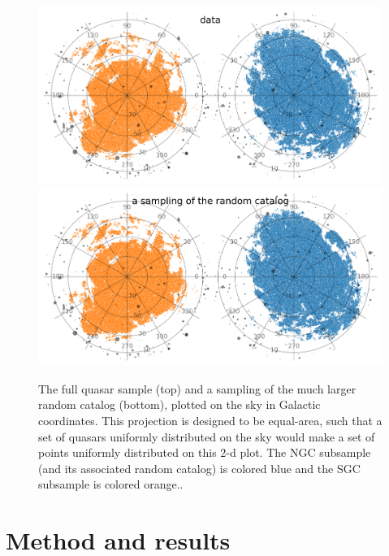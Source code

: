 \documentclass[modern]{aastex631}
\newlength{\figurewidth}
\begin{document}
\begin{figure}[t!]
  \begin{mdframed}
  \color{captiongray}
  \begin{center}
    \includegraphics[width=\figurewidth]{notebooks/lb_better.png}\\
    \includegraphics[width=\figurewidth]{notebooks/lb_random_better.png}
  \end{center}
    \caption{The full quasar sample (top) and a sampling of the much larger random catalog (bottom), plotted on the sky in Galactic coordinates.
    This projection is designed to be equal-area, such that a set of quasars uniformly distributed on the sky would make a set of points uniformly distributed on this 2-d plot.
    The NGC subsample (and its associated random catalog) is colored blue and the SGC subsample is colored orange.\label{fig:lb}.}
  \end{mdframed}
\end{figure}

\section{Method and results}
\end{document}
